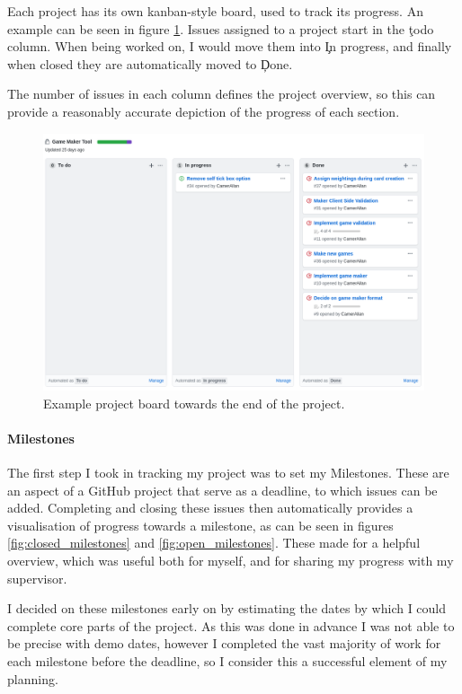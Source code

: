 Each project has its own kanban-style board, used to track its progress. 
An example can be seen in figure \ref{fig:board}. Issues assigned to a project start in the \c{todo} column. When being worked on, I would move them into \c{In progress}, and finally when closed they are automatically moved to \c{Done}.

The number of issues in each column defines the project overview, so this can provide a reasonably accurate depiction of the progress of each section.

\begin{figure}[!h]
	\centering
	\includegraphics[width=1.0\textwidth]{./images/softeng/board.png}
	\caption{Example project board towards the end of the project.}
	\label{fig:board}
\end{figure}

\paragraph{Milestones} The first step I took in tracking my project was to set my Milestones. These are an aspect of a GitHub project that serve as a deadline, to which issues can be added. 
Completing and closing these issues then automatically provides a visualisation of progress towards a milestone, as can be seen in figures \ref{fig:closed_milestones} and \ref{fig:open_milestones}. 
These made for a helpful overview, which was useful both for myself, and for sharing my progress with my supervisor.

I decided on these milestones early on by estimating the dates by which I could complete core parts of the project. As this was done in advance I was not able to be precise with demo dates, however I completed the vast majority of work for each milestone before the deadline, so I consider this a successful element of my planning.

